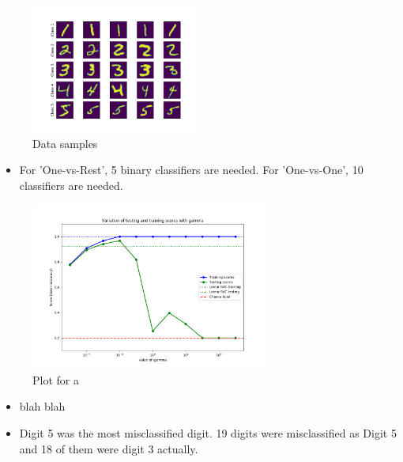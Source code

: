 \documentclass[a4paper]{article}
\begin{document}
\begin{figure}[h]
  \begin{center}
    \includegraphics[width=0.5\textwidth]{3.png}
    \caption{Data samples}
  \end{center}
\end{figure}
\begin{itemize}
  \item For 'One-vs-Rest', 5 binary classifiers are needed. For 'One-vs-One', 10 classifiers are needed.
\end{itemize}
\begin{figure}[h]
  \begin{center}
    \includegraphics[width=0.7\textwidth]{3_a.png}
    \caption{Plot for a}
  \end{center}
\end{figure}
\begin{itemize}
  \item blah blah
  \item Digit 5 was the most misclassified digit. 19 digits were misclassified as Digit 5 and 18 of them were digit 3 actually.
\end{itemize}
\end{document}
